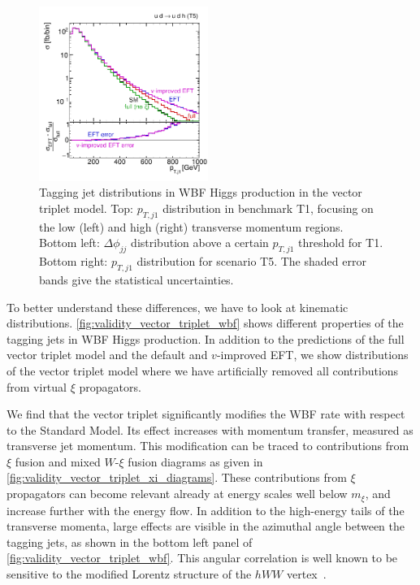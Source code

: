 \begin{figure}
  \includegraphics[width=0.49\textwidth,clip=true,trim=0 0.2cm 0 0.2cm]{fig/validity/Triplet_WBF_realistic.pdf}%
  \caption{Tagging jet distributions in WBF Higgs production in the
    vector triplet model.  Top: $p_{T,j1}$ distribution in benchmark
    T1, focusing on the low (left) and high (right) transverse
    momentum regions.  Bottom left: $\Delta \phi_{jj}$ distribution
    above a certain $p_{T,j1}$ threshold for T1.  Bottom right:
    $p_{T,j1}$ distribution for scenario T5. The shaded error bands
    give the statistical uncertainties.}
  \label{fig:validity_vector_triplet_wbf}
\end{figure}

To better understand these differences, we have to look at kinematic
distributions. \autoref{fig:validity_vector_triplet_wbf} shows
different properties of the tagging jets in WBF Higgs production. In
addition to the predictions of the full vector triplet model and the
default and $v$-improved EFT, we show distributions of the vector
triplet model where we have artificially removed all contributions
from virtual $\xi$ propagators.

We find that the vector triplet significantly modifies the WBF rate
with respect to the Standard Model. Its effect increases with momentum
transfer, measured as transverse jet momentum. This modification can
be traced to contributions from $\xi$ fusion and mixed $W$-$\xi$
fusion diagrams as given in
\autoref{fig:validity_vector_triplet_xi_diagrams}. These contributions
from $\xi$ propagators can become relevant already at energy scales
well below $m_\xi$, and increase further with the energy flow. In
addition to the high-energy tails of the transverse momenta, large
effects are visible in the azimuthal angle between the tagging jets,
as shown in the bottom left panel of
\autoref{fig:validity_vector_triplet_wbf}. This angular correlation is
well known to be sensitive to the modified Lorentz structure of the
$hWW$ vertex~\cite{Eboli:2000ze, Plehn:2001nj, Hankele:2006ma,
  Hagiwara:2009wt, Englert:2012xt, Buckley:2014fqa, Brehmer:2014pka}.

